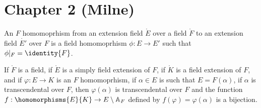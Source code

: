 \documentclass{article}                                                        %
\begin{document}
    \section{Chapter 2 (Milne)}
        \begin{definition}
            An $F$ homomoprhism from an extension field $\ring{E}$ over a field
            $\ring{F}$ to an extension field $\ring{E'}$  over $F$ is a field
            homomoprhism $\phi:E\rightarrow{E}'$ such that
            $\phi|_{F}=\identity{F}$.
        \end{definition}
        \begin{theorem}
            If $\ring{F}$ is a field, if $\ring{E}$ is a simply field extension
            of $F$, if $\ring{K}$ is a field extension of $F$, and if
            $\varphi:E\rightarrow{K}$ is an $F$ homomoprhism, if $\alpha\in{E}$
            is such that $E=F(\alpha)$, if $\alpha$ is transcendental over $F$,
            then $\varphi(\alpha)$ is transcendental over $F$ and the function
            $f:\homomorphisms{E}{K}\rightarrow{E}\setminus\mathbb{A}_{F}$
            defined by $f(\varphi)=\varphi(\alpha)$ is a bijection.
        \end{theorem}
\end{document}
